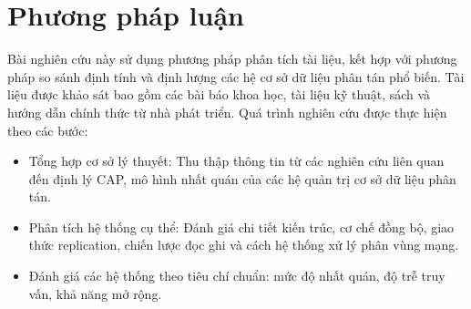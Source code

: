 \documentclass[conference]{IEEEtran}
\begin{document}
\section{Phương pháp luận}
Bài nghiên cứu này sử dụng phương pháp phân tích tài liệu, kết hợp với phương pháp so sánh định tính và định lượng các hệ cơ sở dữ liệu phân tán phổ biến. Tài liệu được khảo sát bao gồm các bài báo khoa học, tài liệu kỹ thuật, sách và hướng dẫn chính thức từ nhà phát triển.
Quá trình nghiên cứu được thực hiện theo các bước:
\begin{itemize}
\item Tổng hợp cơ sở lý thuyết: Thu thập thông tin từ các nghiên cứu liên quan đến định lý CAP, mô hình nhất quán của các hệ quản trị cơ sở dữ liệu phân tán.
\item Phân tích hệ thống cụ thể: Đánh giá chi tiết kiến trúc, cơ chế đồng bộ, giao thức replication, chiến lược đọc ghi và cách hệ thống xử lý phân vùng mạng.
\item Đánh giá các hệ thống theo tiêu chí chuẩn: mức độ nhất quán, độ trễ truy vấn, khả năng mở rộng.
\end{itemize}
\end{document}
